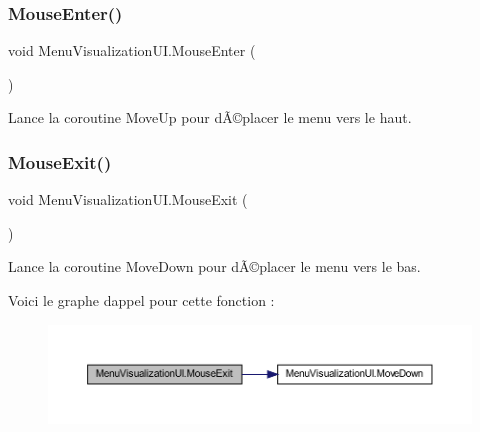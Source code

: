 \subsubsection{\texorpdfstring{Mouse\+Enter()}{MouseEnter()}}
{\footnotesize\ttfamily void Menu\+Visualization\+U\+I.\+Mouse\+Enter (\begin{DoxyParamCaption}{ }\end{DoxyParamCaption})\hspace{0.3cm}{\ttfamily [inline]}}



Lance la coroutine Move\+Up pour dÃ©placer le menu vers le haut. 

\mbox{\label{class_menu_visualization_u_i_a47ce6ce3497846e9048582985fc3d8be}} 
\subsubsection{\texorpdfstring{Mouse\+Exit()}{MouseExit()}}
{\footnotesize\ttfamily void Menu\+Visualization\+U\+I.\+Mouse\+Exit (\begin{DoxyParamCaption}{ }\end{DoxyParamCaption})\hspace{0.3cm}{\ttfamily [inline]}}



Lance la coroutine Move\+Down pour dÃ©placer le menu vers le bas. 

Voici le graphe d\textquotesingle{}appel pour cette fonction \+:
\nopagebreak
\begin{figure}[H]
\begin{center}
\leavevmode
\includegraphics[width=350pt]{class_menu_visualization_u_i_a47ce6ce3497846e9048582985fc3d8be_cgraph}
\end{center}
\end{figure}
\mbox{\label{class_menu_visualization_u_i_a65d11fcd4e858cf3bb0c4fdc95128030}} 
